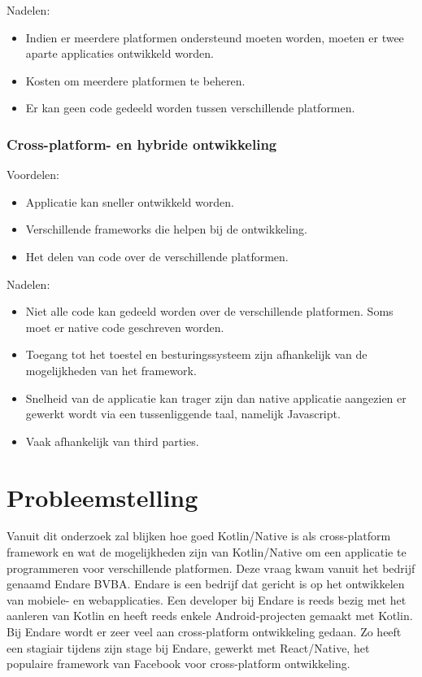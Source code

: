 Nadelen:
\begin{itemize}
	\item Indien er meerdere platformen ondersteund moeten worden, moeten er twee aparte applicaties ontwikkeld worden.
	\item Kosten om meerdere platformen te beheren.
	\item Er kan geen code gedeeld worden tussen verschillende platformen.
\end{itemize}

\subsubsection{Cross-platform- en hybride ontwikkeling}
Voordelen:
\begin{itemize}
	\item Applicatie kan sneller ontwikkeld worden.
	\item Verschillende frameworks die helpen bij de ontwikkeling.
	\item Het delen van code over de verschillende platformen.
\end{itemize}

Nadelen:
\begin{itemize}
	\item Niet alle code kan gedeeld worden over de verschillende platformen. Soms moet er native code geschreven worden.
	\item Toegang tot het toestel en besturingssysteem zijn afhankelijk van de mogelijkheden van het framework.
	\item Snelheid van de applicatie kan trager zijn dan native applicatie aangezien er gewerkt wordt via een tussenliggende taal, namelijk Javascript.
	\item Vaak afhankelijk van third parties.
\end{itemize}

\section{Probleemstelling}
\label{sec:probleemstelling}
Vanuit dit onderzoek zal blijken hoe goed Kotlin/Native is als cross-platform framework en wat de mogelijkheden zijn van Kotlin/Native om een applicatie te programmeren voor verschillende platformen. Deze vraag kwam vanuit het bedrijf genaamd Endare BVBA. Endare is een bedrijf dat gericht is op het ontwikkelen van mobiele- en webapplicaties. Een developer bij Endare is reeds bezig met het aanleren van Kotlin en heeft reeds enkele Android-projecten gemaakt met Kotlin. Bij Endare wordt er zeer veel aan cross-platform ontwikkeling gedaan. Zo heeft een stagiair tijdens zijn stage bij Endare, gewerkt met React/Native, het populaire framework van Facebook voor cross-platform ontwikkeling.

